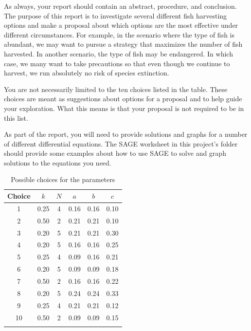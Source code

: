 \documentclass
[justified,nohyper]
{tufte-handout}
\begin{document}
As always, your report should contain an abstract, procedure, and conclusion. The purpose of this
report is to investigate several different fish harvesting options and make a proposal about which
options are the most effective under different circumstances. For example, in the scenario where
the type of fish is abundant, we may want to pursue a strategy that maximizes the number of fish
harvested. In another scenario, the type of fish may be endangered. In which case, we many want to 
take precautions so that even though we continue to harvest, we run absolutely no risk of
species extinction.

You are not necessarily limited to the ten choices listed in the table. These choices are meant
as suggestions about options for a proposal and to help guide your exploration. What this means
is that your proposal is not required to be in this list.

As part of the report, you will need to provide solutions and graphs for a number of different
differential equations. The SAGE worksheet in this project's folder should provide some examples
about how to use SAGE to solve and graph solutions to the equations you need.

\begin{fullwidth}
\begin{table}
\begin{tabular}{cccccc}
\toprule
Choice & $k$ & $N$ & $a$ & $b$ & $c$ \\
\midrule
1 & 0.25 & 4 & 0.16 & 0.16 & 0.10 \\
2 & 0.50 & 2 & 0.21 & 0.21 & 0.10 \\
3 & 0.20 & 5 & 0.21 & 0.21 & 0.30 \\
4 & 0.20 & 5 & 0.16 & 0.16 & 0.25 \\
5 & 0.25 & 4 & 0.09 & 0.16 & 0.21 \\
6 & 0.20 & 5 & 0.09 & 0.09 & 0.18 \\
7 & 0.50 & 2 & 0.16 & 0.16 & 0.22 \\
8 & 0.20 & 5 & 0.24 & 0.24 & 0.33 \\
9 & 0.25 & 4 & 0.21 & 0.21 & 0.12 \\
10 & 0.50 & 2 & 0.09 & 0.09 & 0.15 \\
\bottomrule
\caption{\label{param1} Possible choices for the parameters}
\end{tabular}
\end{table}
\end{fullwidth}
\end{document}

